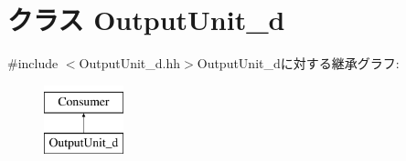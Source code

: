 \hypertarget{classOutputUnit__d}{
\section{クラス OutputUnit\_\-d}
\label{classOutputUnit__d}
}


{\ttfamily \#include $<$OutputUnit\_\-d.hh$>$}OutputUnit\_\-dに対する継承グラフ:\begin{figure}[H]
\begin{center}
\leavevmode
\includegraphics[height=2cm]{classOutputUnit__d}
\end{center}
\end{figure}
